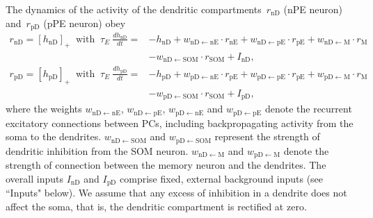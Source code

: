 \documentclass[10pt,a4paper,draft]{article}
\begin{document}
The dynamics of the activity of the dendritic compartments~$r_\mathrm{nD}$ (nPE neuron) and~$r_\mathrm{pD}$ (pPE neuron) obey \citep{wilson1972excitatory}
%
\begin{align}
r_\mathrm{nD} = [h_\mathrm{nD}]_+ \ \mbox{ with }\ \tau_E\ \frac{dh_\mathrm{nD}}{dt} =& - h_\mathrm{nD} +  w_\mathrm{nD\leftarrow nE}\cdot r_\mathrm{nE} +  w_\mathrm{nD\leftarrow pE}\cdot r_\mathrm{pE} + w_\mathrm{nD\leftarrow M}\cdot  r_\mathrm{M} \nonumber\\
& - w_\mathrm{nD\leftarrow SOM}\cdot r_\mathrm{SOM} + I_\mathrm{nD}, \nonumber\\
r_\mathrm{pD} = [h_\mathrm{pD}]_+ \ \mbox{ with }\ \tau_E\ \frac{dh_\mathrm{pD}}{dt} =& - h_\mathrm{pD} +  w_\mathrm{pD\leftarrow nE}\cdot r_\mathrm{pE} +  w_\mathrm{pD\leftarrow pE}\cdot r_\mathrm{pE}+ w_\mathrm{pD\leftarrow M}\cdot  r_\mathrm{M}  \nonumber\\
&- w_\mathrm{pD\leftarrow SOM}\cdot r_\mathrm{SOM} + I_\mathrm{pD},
\end{align}
%
where the weights $w_{\mathrm{nD\leftarrow nE}}$, $w_{\mathrm{nD\leftarrow pE}}$, $w_{\mathrm{pD\leftarrow nE}}$ and $w_{\mathrm{pD\leftarrow pE}}$ denote the recurrent excitatory connections between PCs, including backpropagating activity from the soma to the dendrites. $w_{\mathrm{nD\leftarrow SOM}}$ and $w_{\mathrm{pD\leftarrow SOM}}$ represent the strength of dendritic inhibition from the SOM neuron. $w_{\mathrm{nD\leftarrow M}}$ and $w_{\mathrm{pD\leftarrow M}}$ denote the strength of connection between the memory neuron and the dendrites. The overall inputs $I_\mathrm{nD}$ and $I_\mathrm{pD}$ comprise fixed, external background inputs (see ``Inputs" below). We assume that any excess of inhibition in a dendrite does not affect the soma, that is, the dendritic compartment is rectified at zero. 
\end{document}
